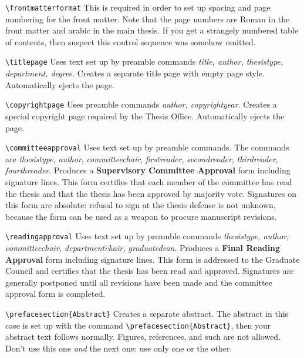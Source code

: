 \begin{description}

\item \verb|\frontmatterformat|
This is required in order to set up spacing and page numbering for the
front matter. Note that the page numbers are Roman in the front matter
and arabic in the main thesis. If you get a strangely numbered table of
contents, then suspect this control sequence was somehow omitted.

\item \verb|\titlepage|
Uses text set up by preamble commands {\em title, author, thesistype,
department, degree}. Creates a separate
title page with empty page style. Automatically ejects the page.

\item \verb|\copyrightpage|
Uses preamble commands {\em author, copy\-right\-year}.
Creates a special copy\-right page required by the Thesis Office.
Automatically ejects the page.

\item \verb|\committeeapproval|
Uses text set up by preamble commands. The commands are {\em
thesistype}, {\em author}, {\em committeechair}, {\em firstreader}, {\em
secondreader}, {\em thirdreader}, {\em fourthreader}.
Produces a {\bf Supervisory Committee Approval} form
including signature lines. This form certifies that each member of the
committee has read the thesis and that the thesis has been approved by
majority vote. Signatures on this form are absolute: refusal
to sign at the thesis defense is not unknown, because the form
can be used as a weapon to procure manuscript revisions.

\item \verb|\readingapproval|
Uses text set up by preamble commands {\em thesistype, author,
committeechair, departmentchair, graduatedean}.
Produces a {\bf Final Reading Approval} form
including signature lines. This form is addressed to the Graduate
Council and certifies that the thesis has been read and approved.
Signatures are generally postponed until all revisions have been made
and the committee approval form is completed.

\item \verb|\prefacesection{Abstract}|
Creates a separate abstract. The abstract in this case is set up with
the command \verb|\prefacesection{Abstract}|, then your abstract text
follows normally.  Figures, references, and such are not allowed.
Don't use this one {\em and} the next one: use only one or the other.


\end{description}
